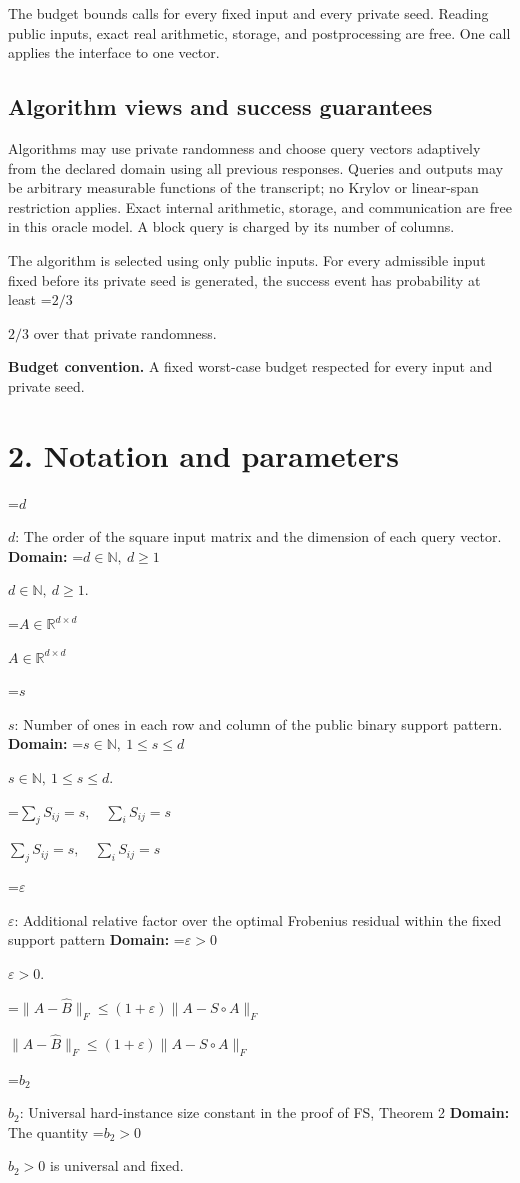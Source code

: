 \documentclass[10pt,a4paper]{article}
\newcommand{\AtlasMath}[1]{\par\begingroup\centering\setbox0=\hbox{$\displaystyle #1$}\ifdim\wd0>1.4\linewidth\typeout{ATLAS WIDE FORMULA: \the\wd0}\fi\ifdim\wd0>\linewidth\resizebox{\linewidth}{!}{\box0}\else\box0\fi\par\endgroup}
\newcommand{\AtlasInlineMath}[1]{\begingroup\setbox0=\hbox{$#1$}\ifdim\wd0>.4\linewidth\endgroup\AtlasMath{#1}\else\endgroup$#1$\fi}
\begin{document}
The budget bounds calls for every fixed input and every private seed. Reading public inputs, exact real arithmetic, storage, and postprocessing are free. One call applies the interface to one vector.

\subsection{Algorithm views and success guarantees}
Algorithms may use private randomness and choose query vectors adaptively from the declared domain using all previous responses. Queries and outputs may be arbitrary measurable functions of the transcript; no Krylov or linear-span restriction applies. Exact internal arithmetic, storage, and communication are free in this oracle model. A block query is charged by its number of columns.

The algorithm is selected using only public inputs. For every admissible input fixed before its private seed is generated, the success event has probability at least \AtlasInlineMath{2/3} over that private randomness.

\textbf{Budget convention.} A fixed worst-case budget respected for every input and private seed.

\section{2. Notation and parameters}
\AtlasInlineMath{d}: The order of the square input matrix and the dimension of each query vector. \textbf{Domain:} \AtlasInlineMath{d\in\mathbb N,\ d\ge1}.

\AtlasInlineMath{A\in\mathbb R^{d\times d}}

\AtlasInlineMath{s}: Number of ones in each row and column of the public binary support pattern. \textbf{Domain:} \AtlasInlineMath{s\in\mathbb N,\ 1\le s\le d}.

\AtlasInlineMath{\sum_j S_{ij}=s,\quad\sum_i S_{ij}=s}

\AtlasInlineMath{\varepsilon}: Additional relative factor over the optimal Frobenius residual within the fixed support pattern \textbf{Domain:} \AtlasInlineMath{\varepsilon>0}.

\AtlasInlineMath{\|A-\widehat B\|_F\le(1+\varepsilon)\|A-S\circ A\|_F}

\AtlasInlineMath{b_2}: Universal hard-instance size constant in the proof of FS, Theorem 2 \textbf{Domain:} The quantity \AtlasInlineMath{b_2>0} is universal and fixed.
\end{document}
